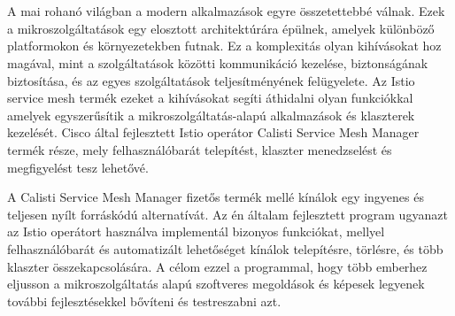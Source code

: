 \chapter{\bevezetes}

A mai rohanó világban a modern alkalmazások egyre összetettebbé válnak. Ezek a mikroszolgáltatások egy elosztott architektúrára épülnek, amelyek különböző platformokon és környezetekben futnak. Ez a komplexitás olyan kihívásokat hoz magával, mint a szolgáltatások közötti kommunikáció kezelése, biztonságának biztosítása, és az egyes szolgáltatások teljesítményének felügyelete. Az Istio service mesh termék ezeket a kihívásokat segíti áthidalni olyan funkciókkal amelyek egyszerűsítik a mikroszolgáltatás-alapú alkalmazások és klaszterek kezelését. Cisco által fejlesztett Istio operátor Calisti Service Mesh Manager termék része, mely felhasználóbarát telepítést, klaszter menedzselést és megfigyelést tesz lehetővé.

A Calisti Service Mesh Manager fizetős termék mellé kínálok egy ingyenes és teljesen nyílt forráskódú alternatívát. Az én általam fejlesztett program ugyanazt az Istio operátort használva implementál bizonyos funkciókat, mellyel felhasználóbarát és automatizált lehetőséget kínálok telepítésre, törlésre, és több klaszter összekapcsolására. A célom ezzel a programmal, hogy több emberhez eljusson a mikroszolgáltatás alapú szoftveres megoldások és képesek legyenek további fejlesztésekkel bővíteni és testreszabni azt.

